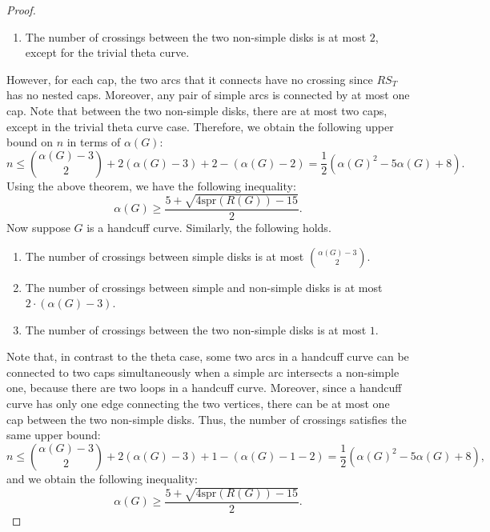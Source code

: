 \documentclass{article}
\theoremstyle{definition}
\theoremstyle{theorem}
\theoremstyle{proposition}
\theoremstyle{corollary}
\begin{document}
\begin{proof}
\begin{enumerate}
        \item The number of crossings between the two non-simple disks is at most $2$, except for the trivial theta curve.
    \end{enumerate}
    However, for each cap, the two arcs that it connects have no crossing since $RS_T$ has no nested caps. Moreover, any pair of simple arcs is connected by at most one cap. Note that between the two non-simple disks, there are at most two caps, except in the trivial theta curve case. Therefore, we obtain the following upper bound on $n$ in terms of $\alpha(G)$:
    \[ n \leq \binom{\alpha(G)-3}{2} + 2(\alpha(G)-3) + 2 - (\alpha(G)-2) = \frac{1}{2} (\alpha(G)^2 - 5 \alpha(G) + 8). \]
    Using the above theorem, we have the following inequality:
    \[ \alpha(G) \geq  \frac{5+\sqrt{4\mathrm{spr}(R(G))-15}}{2}. \]
    Now suppose $G$ is a handcuff curve. Similarly, the following holds.
    \begin{enumerate}
        \item The number of crossings between simple disks is at most $\binom{\alpha(G)-3}{2}$.
        \item The number of crossings between simple and non-simple disks is at most $2 \cdot (\alpha(G)-3)$.
        \item The number of crossings between the two non-simple disks is at most $1$.
    \end{enumerate}
    Note that, in contrast to the theta case, some two arcs in a handcuff curve can be connected to two caps simultaneously when a simple arc intersects a non-simple one, because there are two loops in a handcuff curve. Moreover, since a handcuff curve has only one edge connecting the two vertices, there can be at most one cap between the two non-simple disks. Thus, the number of crossings satisfies the same upper bound:
    \[ n \leq \binom{\alpha(G)-3}{2} + 2(\alpha(G)-3) + 1 - (\alpha(G)-1-2) = \frac{1}{2} (\alpha(G)^2 - 5 \alpha(G) + 8), \]
    and we obtain the following inequality:
    \[ \alpha(G) \geq  \frac{5+\sqrt{4\mathrm{spr}(R(G))-15}}{2}. \]
\end{proof}

\end{document}
